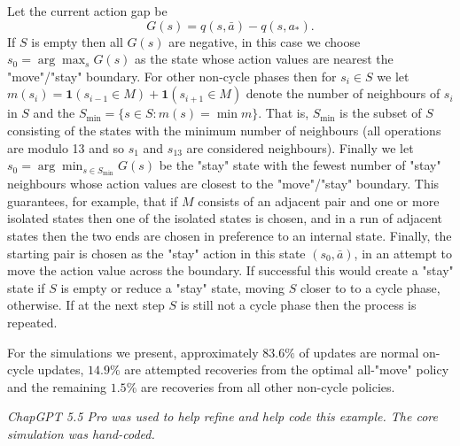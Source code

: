 Let the current action gap be
\begin{equation*}
    G(s)=q(s,\bar a)-q(s,a_*).
\end{equation*}
If $S$ is empty then all $G(s)$ are negative, in this case we choose $s_0=\arg\max_s G(s)$ as the state whose action values are nearest the "move"/"stay" boundary. For other non-cycle phases then for $s_i\in S$ we let $m(s_i)= {\mathbf 1}(s_{i-1}\in M)+ {\mathbf 1}(s_{i+1}\in M)$ denote the number of neighbours of $s_i$ in $S$ and the $S_{\text{min}}=\{s\in S:m(s)=\min m\}$. That is, $S_{\text{min}}$ is the subset of $S$ consisting of the states with the minimum number of neighbours (all operations are modulo 13 and so $s_{1}$ and $s_{13}$ are considered neighbours). Finally we let $s_0=\arg\min_{s\in S_{\text{min}}} G(s)$
be the "stay" state with the fewest number of "stay" neighbours whose action values are closest to the "move"/"stay" boundary. This guarantees, for example, that if $M$ consists of an adjacent pair and one or more isolated states then one of the isolated states is chosen, and in a run of adjacent states then the two ends are chosen in preference to an internal state. Finally, the starting pair is chosen as the "stay" action in this state $(s_0,\bar a)$, in an attempt to move the action value across the boundary. If successful this would create a "stay" state if $S$ is empty or reduce a "stay" state, moving $S$ closer to to a cycle phase, otherwise. If at the next step $S$ is still not a cycle phase then the process is repeated.      

For the simulations we present, approximately $83.6\%$ of updates are
normal on-cycle updates, $14.9\%$ are attempted recoveries from the
optimal all-"move" policy and the remaining $1.5\%$ are recoveries from
all other non-cycle policies.  

\textit{ChapGPT 5.5 Pro was used to help refine and help code this example. The core simulation was hand-coded.}
